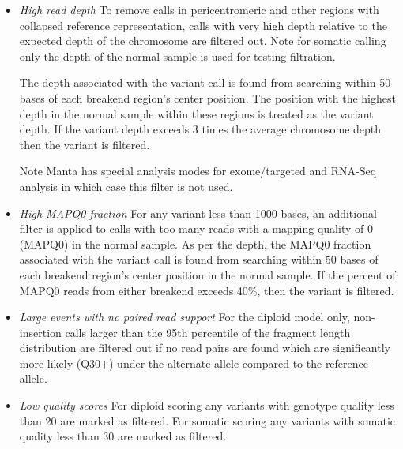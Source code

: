\documentclass{article}
\begin{document}
\begin{itemize}

\item \textit{High read depth} To remove calls in pericentromeric and other regions with collapsed reference representation, calls with very high depth relative to the expected depth of the chromosome are filtered out. Note for somatic calling only the depth of the normal sample is used for testing filtration.

The depth associated with the variant call is found from searching within 50 bases of each breakend region's center position. The position with the highest depth in the normal sample within these regions is treated as the variant depth. If the variant depth exceeds 3 times the average chromosome depth then the variant is filtered.

Note Manta has special analysis modes for exome/targeted and RNA-Seq analysis in which case this filter is not used.

\item \textit{High MAPQ0 fraction} For any variant less than 1000 bases, an additional filter is applied to calls with too many reads with a mapping quality of 0 (MAPQ0) in the normal sample. As per the depth, the MAPQ0 fraction associated with the variant call is found from searching within 50 bases of each breakend region's center position in the normal sample. If the percent of MAPQ0 reads from either breakend exceeds 40\%, then the variant is filtered.

\item \textit{Large events with no paired read support} For the diploid model only, non-insertion calls larger than the 95th percentile of the fragment length distribution are filtered out if no read pairs are found which are significantly more likely (Q30+) under the alternate allele compared to the reference allele.

\item \textit{Low quality scores} For diploid scoring any variants with genotype quality less than 20 are marked as filtered. For somatic scoring any variants with somatic quality less than 30 are marked as filtered.

\end{itemize}




\end{document}
